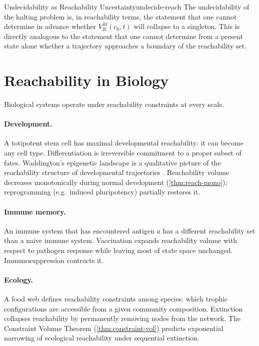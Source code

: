\documentclass[12pt,twoside,openright]{book}
\newcommand{\bioicon}{\marginpar{\tiny\color{DistTeal}\faDna}}
\begin{document}
\begin{remark}{Undecidability as Reachability Uncertainty}{undecide-reach}
  The undecidability of the halting problem is, in
  reachability terms, the statement that one cannot
  determine in advance whether $V_R^M(c_0,t)$ will collapse
  to a singleton. This is directly analogous to the
  statement that one cannot determine from a present state
  alone whether a trajectory approaches a boundary of the
  reachability set.
\end{remark}

\section{Reachability in Biology}
\label{sec:ch13-biology}

\bioicon
Biological systems operate under reachability constraints
at every scale.

\paragraph{Development.} A totipotent stem cell has maximal
developmental reachability: it can become any cell type.
Differentiation is irreversible commitment to a proper
subset of fates. Waddington's epigenetic landscape is a
qualitative picture of the reachability structure of
developmental trajectories \parencite{waddington1957strategy}.
Reachability volume decreases monotonically during normal
development (\cref{thm:reach-mono}); reprogramming
(e.g.\ induced pluripotency) partially restores it.

\paragraph{Immune memory.} An immune system that has
encountered antigen $a$ has a different reachability set
than a naive immune system. Vaccination expands
reachability volume with respect to pathogen response while
leaving most of state space unchanged. Immunosuppression
contracts it.

\paragraph{Ecology.} A food web defines reachability
constraints among species: which trophic configurations are
accessible from a given community composition. Extinction
collapses reachability by permanently removing nodes from
the network. The Constraint Volume Theorem
(\cref{thm:constraint-vol}) predicts exponential narrowing
of ecological reachability under sequential extinction.
\end{document}

